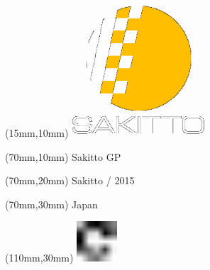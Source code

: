 \null\newpage
\begin{textblock*}{50mm}(15mm,10mm)%
\includegraphics[width=50mm]{LG/SAK.png}
\end{textblock*}
\begin{textblock*}{130mm}(70mm,10mm)%
{\fontsize{20}{20}\selectfont Sakitto GP}\\
\end{textblock*}
\begin{textblock*}{120mm}(70mm,20mm)%
{\fontsize{16}{16}\selectfont Sakitto / 2015}\\
\end{textblock*}
\begin{textblock*}{120mm}(70mm,30mm)%
{\fontsize{12}{12}\selectfont Japan}
\end{textblock*}
\begin{textblock*}{30mm}(110mm,30mm)%
\centering
\includegraphics[height=15mm]{icons/fa-rotate-right.pdf}
\end{textblock*}
